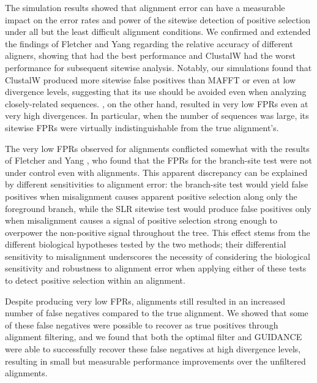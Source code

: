 \documentclass{article}
\begin{document}
The simulation results showed that alignment error can have a
measurable impact on the error rates and power of the sitewise
detection of positive selection under all but the least difficult
alignment conditions. We confirmed and extended the findings of
Fletcher and Yang \citeyearpar{Fletcher2010Effect} regarding the
relative accuracy of different aligners, showing that \prankc had the
best performance and ClustalW had the worst performance for subsequent
sitewise analysis. Notably, our simulations found that ClustalW
produced more sitewise false positives than MAFFT or \prankc even at
low divergence levels, suggesting that its use should be avoided even
when analyzing closely-related sequences. \prankc, on the other hand,
resulted in very low FPRs even at very high divergences. In
particular, when the number of sequences was large, its sitewise FPRs
were virtually indistinguishable from the true alignment's.

The very low FPRs observed for \prankc alignments conflicted somewhat
with the results of Fletcher and Yang
\citeyearpar{Fletcher2010Effect}, who found that the FPRs for the
branch-site test were not under control even with \prankc
alignments. This apparent discrepancy can be explained by different
sensitivities to alignment error: the branch-site test would yield
false positives when misalignment causes apparent positive selection
along only the foreground branch, while the SLR sitewise test would produce
false positives only when misalignment causes a signal of positive
selection strong enough to overpower the non-positive signal
throughout the tree. This effect stems from the different biological
hypotheses tested by the two methods; their differential sensitivity
to misalignment underscores the necessity of considering the
biological sensitivity and robustness to alignment error when applying
either of these tests to detect positive selection within an
alignment.

Despite producing very low FPRs, \prankc alignments still resulted in
an increased number of false negatives compared to the true
alignment. We showed that some of these false negatives were possible
to recover as true positives through alignment filtering, and we found
that both the optimal filter and GUIDANCE were able to successfully
recover these false negatives at high divergence levels, resulting in
small but measurable performance improvements over the unfiltered
\prankc alignments.
\end{document}
